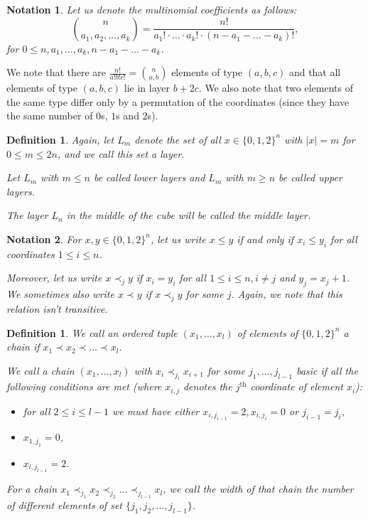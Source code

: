 \documentclass[11pt, reqno]{amsart}
\newtheorem{definition}[theorem]{Definition}
\newtheorem*{notation}{Notation}
\numberwithin{equation}{section}
\newcommand{\cube}{\{0, 1, 2\}^n}
\begin{document}
\begin{notation}
    Let us denote the multinomial coefficients as follows:
    \begin{equation*}
        \binom{n}{a_1, a_2, \dots, a_k} = \frac{n!}{a_1! \cdot \dots \cdot a_k! \cdot (n-a_1 - \dots - a_k)!},
    \end{equation*}
    for $0 \leqslant n, a_1, \dots, a_k, n-a_1-\dots -a_k$.
\end{notation}

We note that there are $\frac{n!}{a!b!c!}=\binom{n}{a,b}$ elements of type $(a, b, c)$ and that all elements of type $(a, b, c)$ lie in layer $b+2c$. We also note that two elements of the same type differ only by a permutation of the coordinates (since they have the same number of $0$s, $1$s and $2$s).

\begin{definition}
    Again, let $L_m$ denote the set of all $x \in \{0, 1, 2\}^n$ with $|x|=m$ for $0 \leqslant m \leqslant 2n$, and we call this set a \emph{layer.}

    Let $L_m$ with $m \leqslant n$ be called \emph{lower layers} and $L_m$ with $m \geqslant n$ be called \emph{upper layers.}

    The layer $L_n$ in the middle of the cube will be called the \emph{middle layer.}
\end{definition}

\begin{notation}
    For $x, y \in \{0, 1, 2\}^n$, let us write $x \leqslant y$ if and only if $x_i \leqslant y_i$ for all coordinates $1 \leqslant i \leqslant n$.

    Moreover, let us write $x \prec_j y$ if $x_i=y_i$ for all $1 \leqslant i \leqslant n, i \neq j$ and $y_j=x_j+1$. We sometimes also write $x \prec y$ if $x \prec_j y$ for some $j$. Again, we note that this relation isn't transitive.
\end{notation}

\begin{definition}
\label{basic_definition}
    We call an ordered tuple $(x_1, \dots, x_l)$ of elements of $\cube$ a \emph{chain} if $x_1 \prec x_2 \prec \dots \prec x_l$.

    We call a chain $(x_1, \dots, x_l)$ with $x_{i} \prec_{j_i} x_{i+1}$ for some $j_1, \dots, j_{l-1}$ \emph{basic} if all the following conditions are met (where $x_{i,j}$ denotes the $j^{\text{th}}$ coordinate of element $x_i$):
    \begin{itemize}
        \item for all $2 \leqslant i \leqslant l-1$ we must have either $x_{i,j_{i-1}}=2, x_{i, j_{i}}=0$ or $j_{i-1}=j_i$,
        \item $x_{1, j_1}=0$,
        \item $x_{l, j_{l-1}}=2$.
    \end{itemize}

    For a chain $x_1 \prec_{j_1} x_2 \prec_{j_2} \dots \prec_{j_{l-1}} x_l$, we call the \emph{width} of that chain the number of different elements of set $\{j_1, j_2, \dots, j_{l-1}\}$.
\end{definition}
\end{document}
